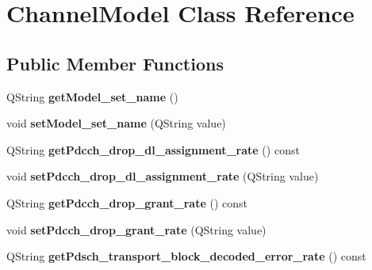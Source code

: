 \hypertarget{class_channel_model}{}\section{Channel\+Model Class Reference}
\label{class_channel_model}
\subsection*{Public Member Functions}
\begin{DoxyCompactItemize}
\item 
Q\+String {\bfseries get\+Model\+\_\+set\+\_\+name} ()\hypertarget{class_channel_model_a47e90cc85542a4832b5b01a535dfd769}{}\label{class_channel_model_a47e90cc85542a4832b5b01a535dfd769}

\item 
void {\bfseries set\+Model\+\_\+set\+\_\+name} (Q\+String value)\hypertarget{class_channel_model_ad9460d253362deaa0bdae23611ab25cb}{}\label{class_channel_model_ad9460d253362deaa0bdae23611ab25cb}

\item 
Q\+String {\bfseries get\+Pdcch\+\_\+drop\+\_\+dl\+\_\+assignment\+\_\+rate} () const \hypertarget{class_channel_model_a66251d1d429b44ffcdfe88b5b0394f20}{}\label{class_channel_model_a66251d1d429b44ffcdfe88b5b0394f20}

\item 
void {\bfseries set\+Pdcch\+\_\+drop\+\_\+dl\+\_\+assignment\+\_\+rate} (Q\+String value)\hypertarget{class_channel_model_a65b9df4da57a3bf781d883c7a69e8e47}{}\label{class_channel_model_a65b9df4da57a3bf781d883c7a69e8e47}

\item 
Q\+String {\bfseries get\+Pdcch\+\_\+drop\+\_\+grant\+\_\+rate} () const \hypertarget{class_channel_model_ae61c0591404f59884a596dacf4ddcff1}{}\label{class_channel_model_ae61c0591404f59884a596dacf4ddcff1}

\item 
void {\bfseries set\+Pdcch\+\_\+drop\+\_\+grant\+\_\+rate} (Q\+String value)\hypertarget{class_channel_model_a776b919d80e8ac1ffa7d69eff6b27d2f}{}\label{class_channel_model_a776b919d80e8ac1ffa7d69eff6b27d2f}

\item 
Q\+String {\bfseries get\+Pdsch\+\_\+transport\+\_\+block\+\_\+decoded\+\_\+error\+\_\+rate} () const \hypertarget{class_channel_model_a7ed0521786b53a53e5e35700e4d086a3}{}\label{class_channel_model_a7ed0521786b53a53e5e35700e4d086a3}


\end{DoxyCompactItemize}

